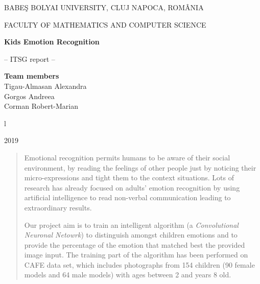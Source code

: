 \documentclass[runningheads,a4paper,11pt]{report}
\begin{document}
\begin{titlepage}
\sloppy
\begin{center}
BABE\c S BOLYAI UNIVERSITY, CLUJ NAPOCA, ROM\^ ANIA

FACULTY OF MATHEMATICS AND COMPUTER SCIENCE

\vspace{6cm}

\Huge \textbf{Kids Emotion Recognition}

\vspace{1cm}

\normalsize -- ITSG report --

\end{center}


\vspace{5cm}

\begin{flushright}
\Large{\textbf{Team members}}\\
Tigau-Almasan Alexandra \\
Gorgos Andreea \\
Corman Robert-Marian \\
\end{flushright}

\vspace{4cm}
l
\begin{center}
2019
\end{center}

\end{titlepage}


\begin{abstract}

    Emotional recognition permits humans to be aware of their social environment, by reading the feelings of other people just by noticing their micro-expressions and tight them to the context situations. Lots of research has already focused on adults' emotion recognition by using artificial intelligence to read non-verbal communication leading to extraordinary results.

    Our project aim is to train an intelligent algorithm (a \textit{Convolutional Neuronal Netowrk}) to distinguish amongst children emotions and to provide the percentage of the emotion that matched best the provided image input.
    The training part of the algorithm has been performed on CAFE \cite{LoBlue2015} data set, which includes photographs from 154 children (90 female models and 64 male models) with ages between 2 and years 8 old.

\end{abstract}
\end{document}
